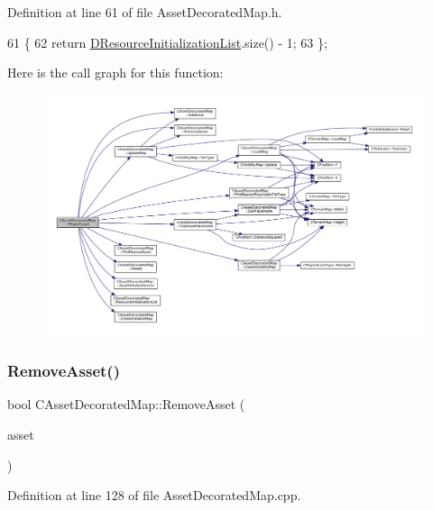 Definition at line 61 of file Asset\+Decorated\+Map.\+h.


\begin{DoxyCode}
61                                \{
62              \textcolor{keywordflow}{return} \hyperlink{classCAssetDecoratedMap_ab4c78aeb90280ea98a3aa542cdb7f8cc}{DResourceInitializationList}.size() - 1;
63         \};
\end{DoxyCode}
Here is the call graph for this function\+:\nopagebreak
\begin{figure}[H]
\begin{center}
\leavevmode
\includegraphics[width=350pt]{classCAssetDecoratedMap_a1ead2938a9585fa82b5b5ef72efe6eba_cgraph}
\end{center}
\end{figure}
\hypertarget{classCAssetDecoratedMap_a77f46be1ceb30bb83fc3f35c0d58a9a7}{}\label{classCAssetDecoratedMap_a77f46be1ceb30bb83fc3f35c0d58a9a7} 
\subsubsection{\texorpdfstring{Remove\+Asset()}{RemoveAsset()}}
{\footnotesize\ttfamily bool C\+Asset\+Decorated\+Map\+::\+Remove\+Asset (\begin{DoxyParamCaption}\item[{std\+::shared\+\_\+ptr$<$ \hyperlink{classCPlayerAsset}{C\+Player\+Asset} $>$}]{asset }\end{DoxyParamCaption})}



Definition at line 128 of file Asset\+Decorated\+Map.\+cpp.


